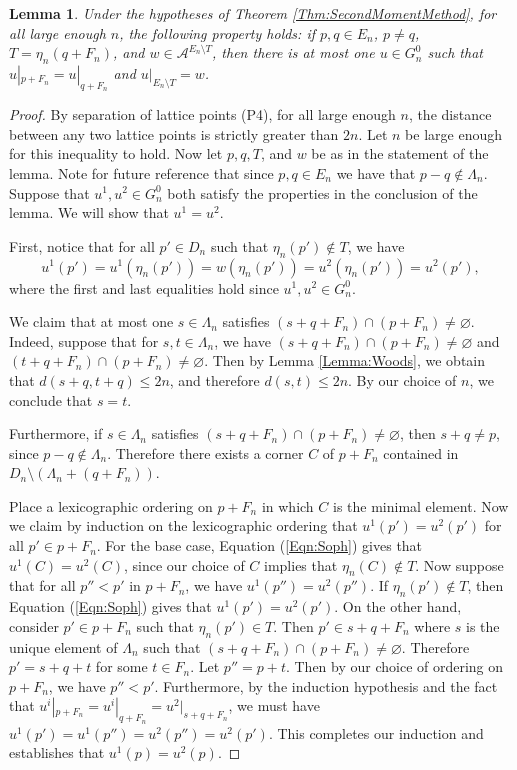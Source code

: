\documentclass[12pt]{amsart}
\newtheorem{lemma}[theorem]{Lemma}
\theoremstyle{definition}
\begin{document}
\begin{lemma} \label{Lemma:LukeMaye}
Under the hypotheses of Theorem \ref{Thm:SecondMomentMethod}, for all large enough $n$, the following property holds: if $p, q \in E_n$, $p \neq q$, $T = \eta_n(q+F_n)$, and $w \in \mathcal{A}^{E_n \setminus T}$, then there is at most one $u \in G_n^0$ such that $u|_{p + F_n} = u|_{q +F_n}$ and $u|_{E_n \setminus T} = w$.
\end{lemma}
\begin{proof}
By separation of lattice points (P4), for all large enough $n$, the distance between any two lattice points is strictly greater than $2n$.
Let $n$ be large enough for this inequality to hold.
Now let $p,q,T$, and $w$ be as in the statement of the lemma. Note for future reference that since $p,q \in E_n$ we have that $p-q \notin \Lambda_n$. Suppose that $u^1,u^2 \in G_n^0$ both satisfy the properties in the conclusion of the lemma. We will show that $u^1 = u^2$.

First, notice that for all $p' \in D_n$ such that $\eta_n(p') \notin T$, we have 
\begin{equation} \label{Eqn:Soph}
u^1(p') = u^1(\eta_n(p')) = w(\eta_n(p')) = u^2(\eta_n(p')) = u^2(p'),
\end{equation}
where the first and last equalities hold since $u^1,u^2 \in G_n^0$.


We claim that at most one $s \in \Lambda_n$ satisfies $(s+q+F_n) \cap (p+F_n) \neq \varnothing$. Indeed, suppose that for $s,t \in \Lambda_n$, we have $(s+q+F_n) \cap (p+F_n) \neq \varnothing$ and $(t+q+F_n) \cap (p+F_n) \neq \varnothing$. Then by Lemma \ref{Lemma:Woods}, we obtain that $d(s+q,t+q) \leq 2n$, and therefore $d(s,t) \leq 2n$. By our choice of $n$, we conclude that $s = t$. 

Furthermore, if $s \in \Lambda_n$ satisfies $(s+q+F_n) \cap (p+F_n) \neq \varnothing$, then $s+q \neq p$, since $p-q \notin \Lambda_n$. Therefore there exists a corner $C$ of $p+F_n$ contained in $D_n \setminus (\Lambda_n + (q+F_n))$.

Place a lexicographic ordering on $p + F_n$ in which $C$ is the minimal element. Now we claim by induction on the lexicographic ordering that $u^1(p') = u^2(p')$ for all $p' \in p+F_n$. For the base case, Equation (\ref{Eqn:Soph}) gives that $u^1(C) = u^2(C)$, since our choice of $C$ implies that $\eta_n(C) \notin T$. Now suppose that for all $p'' < p'$ in $p+F_n$, we have $u^1(p'') = u^2(p'')$. If $\eta_n(p') \notin T$, then Equation (\ref{Eqn:Soph}) gives that $u^1(p') = u^2(p')$. On the other hand, consider $p' \in p+F_n$ such that $\eta_n(p') \in T$.  Then $p' \in s + q + F_n$ where $s$ is the unique element of $\Lambda_n$ such that $(s+q+F_n) \cap (p+F_n) \neq \varnothing$. Therefore $p' = s+q+t$ for some $t \in F_n$. Let $p'' = p +t$. Then by our choice of ordering on $p+F_n$, we have $p'' < p'$. Furthermore, by the induction hypothesis and the fact that $u^i|_{p+F_n} = u^i|_{q+F_n} = u^2|_{s+q+F_n}$, we must have $u^1(p') = u^1(p'') = u^2(p'') = u^2(p')$. This completes our induction and establishes that $u^1(p) = u^2(p)$.


\end{proof}
\end{document}
